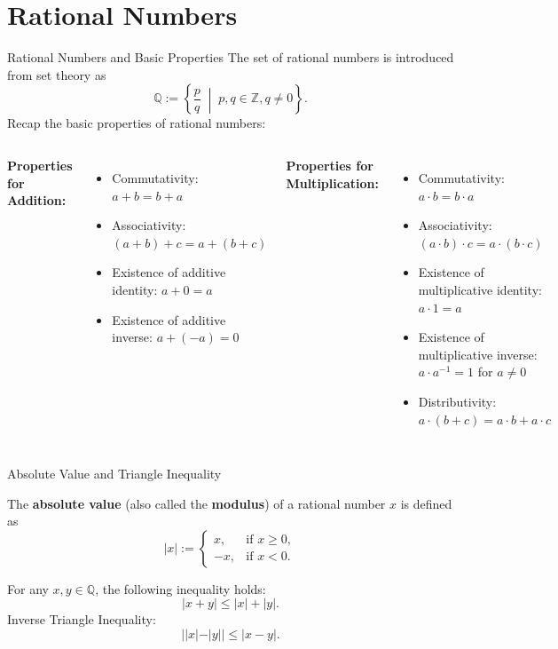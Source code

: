 \documentclass[dvipsnames]{beamer}
\theoremstyle{plain}
\theoremstyle{definition}
\begin{document}
\section{Rational Numbers}
\begin{frame}{Rational Numbers and Basic Properties}
    The set of rational numbers is introduced from set theory as
    \[
    \mathbb{Q} := \left\{ \frac{p}{q} \;\middle|\; p,q \in \mathbb{Z}, q \ne 0 \right\}.
    \]
    Recap the basic properties of rational numbers:
    \vspace{0.2cm}
    \begin{columns}[t]
    \textbf{Properties for Addition:}
    \begin{itemize}
        \item Commutativity: $a + b = b + a$
        \item Associativity: $(a + b) + c = a + (b + c)$
        \item Existence of additive identity: $a + 0 = a$
        \item Existence of additive inverse: $a + (-a) = 0$
    \end{itemize}
    \textbf{Properties for Multiplication:}
    \begin{itemize}
        \item Commutativity: $a \cdot b = b \cdot a$
        \item Associativity: $(a \cdot b) \cdot c = a \cdot (b \cdot c)$
        \item Existence of multiplicative identity: $a \cdot 1 = a$
        \item Existence of multiplicative inverse: $a \cdot a^{-1} = 1$ for $a \ne 0$
        \item Distributivity: $a \cdot (b + c) = a \cdot b + a \cdot c$
    \end{itemize}
    \end{columns}
\end{frame}
\begin{frame}{Absolute Value and Triangle Inequality}
    \begin{definition}
        The \textbf{absolute value} (also called the \textbf{modulus}) of a rational number $x$ is defined as
        \[
        |x| := \begin{cases}
            x, & \text{if } x \ge 0, \\
            -x, & \text{if } x < 0.
        \end{cases}
        \]
    \end{definition}
    \begin{theorem}
        For any $x,y \in \mathbb{Q}$, the following inequality holds:
        \[
        |x + y| \le |x| + |y|.
        \]
        Inverse Triangle Inequality:
        \[
        ||x| - |y|| \le |x - y|.
        \]
    \end{theorem}
\end{frame}
\end{document}
